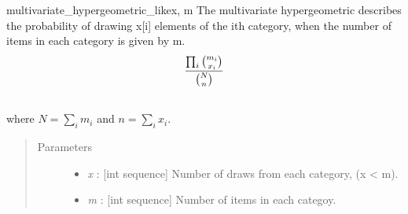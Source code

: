 \hypertarget{pymc.distributions.multivariate_hypergeometric_like}{}\begin{funcdesc}{multivariate\_hypergeometric\_like}{x, m}
The multivariate hypergeometric describes the probability of drawing x{[}i{]}
elements of the ith category, when the number of items in each category is
given by m.
\begin{gather}
\begin{split}\frac{\prod_i \binom{m_i}{x_i}}{\binom{N}{n}}\end{split}\notag\\\begin{split}\end{split}\notag
\end{gather}
where $N = \sum_i m_i$ and $n = \sum_i x_i$.
\begin{quote}\begin{description}
\item[Parameters] \leavevmode\begin{itemize}
\item {} 
\emph{x} : {[}int sequence{]} Number of draws from each category, (x \textless{} m).

\item {} 
\emph{m} : {[}int sequence{]} Number of items in each categoy.

\end{itemize}

\end{description}\end{quote}
\end{funcdesc}

